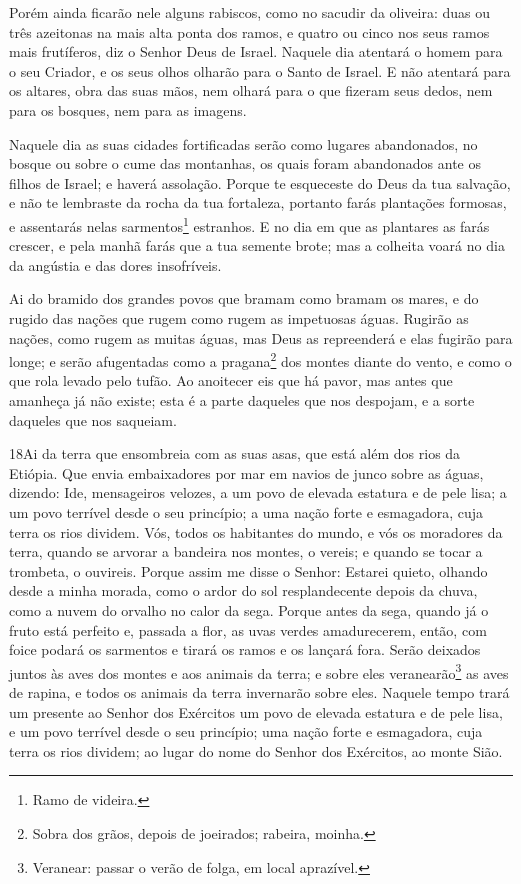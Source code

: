 Porém ainda ficarão nele alguns rabiscos, como no sacudir da
oliveira: duas ou três azeitonas na mais alta ponta dos ramos, e
quatro ou cinco nos seus ramos mais frutíferos, diz o Senhor Deus de
Israel. Naquele dia atentará o homem para o seu Criador, e os
seus olhos olharão para o Santo de Israel. E não atentará para
os altares, obra das suas mãos, nem olhará para o que fizeram seus
dedos, nem para os bosques, nem para as imagens.

Naquele dia as suas cidades fortificadas serão como lugares
abandonados, no bosque ou sobre o cume das montanhas, os quais foram
abandonados ante os filhos de Israel; e haverá assolação.
Porque te esqueceste do Deus da tua salvação, e não te
lembraste da rocha da tua fortaleza, portanto farás plantações
formosas, e assentarás nelas sarmentos\footnote{Ramo de videira.}
estranhos. E no dia em que as plantares as farás crescer, e
pela manhã farás que a tua semente brote; mas a colheita voará no
dia da angústia e das dores insofríveis.

Ai do bramido dos grandes povos que bramam como bramam os mares,
e do rugido das nações que rugem como rugem as impetuosas águas.
Rugirão as nações, como rugem as muitas águas, mas Deus as
repreenderá e elas fugirão para longe; e serão afugentadas como a
pragana\footnote{Sobra dos grãos, depois de joeirados; rabeira,
moinha.} dos montes diante do vento, e como o que rola levado pelo
tufão. Ao anoitecer eis que há pavor, mas antes que amanheça
já não existe; esta é a parte daqueles que nos despojam, e a sorte
daqueles que nos saqueiam.

\medskip

\lettrine{18}{}Ai da terra que ensombreia com as suas asas, que
está além dos rios da Etiópia. Que envia embaixadores por mar em
navios de junco sobre as águas, dizendo: Ide, mensageiros velozes, a
um povo de elevada estatura e de pele lisa; a um povo terrível desde
o seu princípio; a uma nação forte e esmagadora, cuja terra os rios
dividem. Vós, todos os habitantes do mundo, e vós os moradores
da terra, quando se arvorar a bandeira nos montes, o vereis; e
quando se tocar a trombeta, o ouvireis. Porque assim me disse o
Senhor: Estarei quieto, olhando desde a minha morada, como o ardor
do sol resplandecente depois da chuva, como a nuvem do orvalho no
calor da sega. Porque antes da sega, quando já o fruto está
perfeito e, passada a flor, as uvas verdes amadurecerem, então, com
foice podará os sarmentos e tirará os ramos e os lançará fora.
Serão deixados juntos às aves dos montes e aos animais da terra;
e sobre eles veranearão\footnote{Veranear: passar o verão de folga,
em local aprazível.} as aves de rapina, e todos os animais da terra
invernarão sobre eles. Naquele tempo trará um presente ao Senhor
dos Exércitos um povo de elevada estatura e de pele lisa, e um povo
terrível desde o seu princípio; uma nação forte e esmagadora, cuja
terra os rios dividem; ao lugar do nome do Senhor dos Exércitos, ao
monte Sião.

